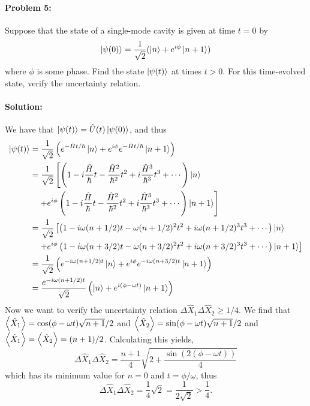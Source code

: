 \paragraph{Problem 5:} Suppose that the state of a single-mode cavity is given at time $t=0$ by
\begin{equation}
    \ket{\psi(0)} = \frac{1}{\sqrt{2}} (\ket{n} + e^{i\phi}\ket{n+1})
\end{equation}
where $\phi$ is some phase. Find the state $\ket{\psi(t)}$ at times $t>0$. For  this time-evolved state, verify the uncertainty relation.
\paragraph{Solution:} We have that $\ket{\psi(t)} = \hat U(t) \ket{\psi(0)}$, and thus
\begin{align}
    \ket{\psi(t)} &= \frac{1}{\sqrt{2}} \left( e^{- \hamiltonian t /\hbar} \ket{n} + e^{i\phi} e^{- \hamiltonian t /\hbar}\ket{n+1} \right)\\
    &= \frac{1}{\sqrt{2}} \left[ \left( 1 - i\frac{\hamiltonian}{\hbar}t - \frac{\hamiltonian^2}{\hbar^2}t^2 + i \frac{\hamiltonian^3}{\hbar^3}t^3 + \cdots \right)\ket{n} \right. \\ 
    &\left. \quad+ e^{i\phi} \left( 1 - i\frac{\hamiltonian}{\hbar}t - \frac{\hamiltonian^2}{\hbar^2}t^2 + i \frac{\hamiltonian^3}{\hbar^3}t^3 + \cdots \right)\ket{n+1} \right]\\
    &=\frac{1}{\sqrt{2}} \left[ \left( 1 - i\omega(n + 1/2)t - \omega(n + 1/2)^2t^2 + i \omega(n + 1/2)^3t^3 + \cdots \right)\ket{n} \right. \\ 
    &\left. \quad+ e^{i\phi} \left( 1 - i\omega(n + 3/2)t - \omega(n + 3/2)^2t^2 + i \omega(n + 3/2)^3t^3 + \cdots \right)\ket{n+1} \right] \\
    &= \frac{1}{\sqrt{2}} \left( e^{-i \omega (n+1/2)t}\ket{n} + e^{i\phi} e^{-i\omega(n+3/2)t}\ket{n+1} \right)\\
    &= \frac{e^{-i\omega(n+1/2)t}}{\sqrt{2}} \left(\ket{n} + e^{i(\phi - \omega t)}\ket{n+1}\right)
\end{align}
Now we want to verify the uncertainty relation $\Delta \hat{X}_1 \Delta \hat{X}_2 \geq 1/4$. We find that $\expval{\hat X_1} = \cos(\phi - \omega t) \sqrt{n+1}/2$ and $\expval{\hat X_2} = \sin(\phi - \omega t) \sqrt{n+1}/2$ and $\expval{\hat{X}_1} = \expval{\hat X_2} = (n+1)/2$. Calculating this yields,
\begin{equation}
    \Delta \hat{X}_1 \Delta \hat{X}_2 = \frac{n+1}{4} \sqrt{2 + \frac{\sin(2(\phi - \omega t))}{4}}
\end{equation}
which has its minimum value for $n=0$ and $t = \phi/\omega$, thus
\begin{equation}
    \Delta \hat{X}_1 \Delta \hat{X}_2 = \frac{1}{4} \sqrt{2} = \frac{1}{2\sqrt{2}} > \frac{1}{4}.
\end{equation}

